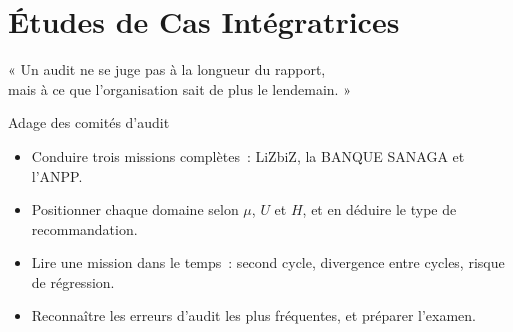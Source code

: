 
\chapter{Études de Cas Intégratrices}
\label{chap:cas-integrateurs}

\epigraph{%
    « Un audit ne se juge pas à la longueur du rapport,\\
    mais à ce que l'organisation sait de plus le lendemain. »%
}{Adage des comités d'audit}


\begin{boxobjectifs}
\begin{itemize}
    \item Conduire trois missions complètes~: LiZbiZ, la BANQUE SANAGA et
          l'ANPP.
    \item Positionner chaque domaine selon $\mu$, $U$ et $H$, et en déduire
          le type de recommandation.
    \item Lire une mission dans le temps~: second cycle, divergence entre
          cycles, risque de régression.
    \item Reconnaître les erreurs d'audit les plus fréquentes, et préparer
          l'examen.
\end{itemize}
\end{boxobjectifs}

